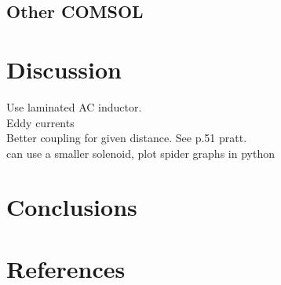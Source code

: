 \documentclass[11pt]{iopart}
\begin{document}
\subsection{Other COMSOL}

\section{Discussion}
Use laminated AC inductor. \\
Eddy currents\\
Better coupling for given distance. See p.51 pratt. \\
can use a smaller solenoid, plot spider graphs in python\\
\section{Conclusions}
\section{References}
\end{document}
